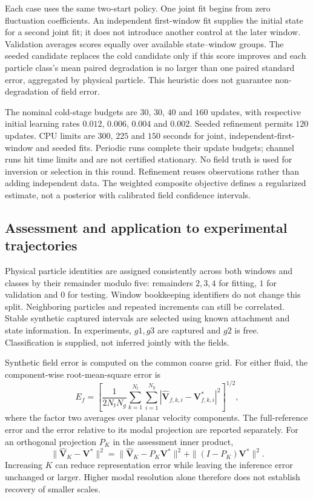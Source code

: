 \documentclass[11pt]{article}
\numberwithin{equation}{section}
\begin{document}
Each case uses the same two-start policy. One joint fit begins from zero fluctuation coefficients. An independent first-window fit supplies the initial state for a second joint fit; it does not introduce another control at the later window. Validation averages scores equally over available state--window groups. The seeded candidate replaces the cold candidate only if this score improves and each particle class's mean paired degradation is no larger than one paired standard error, aggregated by physical particle. This heuristic does not guarantee non-degradation of field error.

The nominal cold-stage budgets are $30$, $30$, $40$ and $160$ updates, with respective initial learning rates $0.012$, $0.006$, $0.004$ and $0.002$. Seeded refinement permits $120$ updates. CPU limits are $300$, $225$ and $150$ seconds for joint, independent-first-window and seeded fits. Periodic runs complete their update budgets; channel runs hit time limits and are not certified stationary. No field truth is used for inversion or selection in this round. Refinement reuses observations rather than adding independent data. The weighted composite objective defines a regularized estimate, not a posterior with calibrated field confidence intervals.

\subsection{Assessment and application to experimental trajectories}
\label{sec:assessment}

Physical particle identities are assigned consistently across both windows and classes by their remainder modulo five: remainders $2,3,4$ for fitting, $1$ for validation and $0$ for testing. Window bookkeeping identifiers do not change this split. Neighboring particles and repeated increments can still be correlated. Stable synthetic captured intervals are selected using known attachment and state information. In experiments, $g1,g3$ are captured and $g2$ is free. Classification is supplied, not inferred jointly with the fields.

Synthetic field error is computed on the common coarse grid. For either fluid, the component-wise root-mean-square error is
\begin{equation}
 E_f=\left[\frac{1}{2N_tN_g}\sum_{k=1}^{N_t}\sum_{i=1}^{N_g}
   |\widehat{\mathbf V}_{f,k,i}-\mathbf V^*_{f,k,i}|^2\right]^{1/2},
 \label{eq:fieldRMS}
\end{equation}
where the factor two averages over planar velocity components. The full-reference error and the error relative to its modal projection are reported separately. For an orthogonal projection $P_K$ in the assessment inner product,
\begin{equation}
 \|\widehat{\mathbf V}_K-\mathbf V^*\|^2
 =\|\widehat{\mathbf V}_K-P_K\mathbf V^*\|^2
   +\|(I-P_K)\mathbf V^*\|^2.
 \label{eq:projectionerror}
\end{equation}
Increasing $K$ can reduce representation error while leaving the inference error unchanged or larger. Higher modal resolution alone therefore does not establish recovery of smaller scales.
\end{document}
